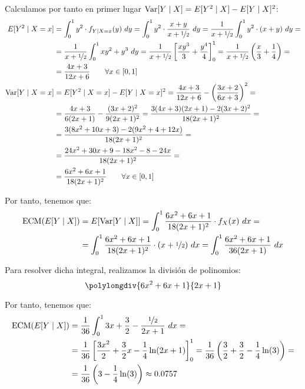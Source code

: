 \begin{ejercicio}
\begin{enumerate}
        Calculamos por tanto en primer lugar $\operatorname{Var}[Y\mid X] = E[Y^2\mid X] - E[Y\mid X]^2$:
        \begin{align*}
            E[Y^2\mid X = x] &= \int_{0}^{1} y^2\cdot f_{Y\mid X=x}(y) \ dy
            = \int_{0}^{1} y^2\cdot \dfrac{x+y}{x+\nicefrac{1}{2}} \ dy
            = \dfrac{1}{x+\nicefrac{1}{2}}\int_{0}^{1} y^2\cdot (x+y) \ dy
            =\\&= \dfrac{1}{x+\nicefrac{1}{2}}\int_{0}^{1} xy^2+y^3 \ dy
            = \dfrac{1}{x+\nicefrac{1}{2}}\left[\frac{xy^3}{3}+\frac{y^4}{4}\right]_{0}^{1}
            = \dfrac{1}{x+\nicefrac{1}{2}}\left(\frac{x}{3}+\frac{1}{4}\right)
            =\\&= \dfrac{4x+3}{12x+6} \qquad \forall x\in[0,1]\\
            \Var[Y\mid X = x] &= E[Y^2\mid X = x] - E[Y\mid X = x]^2
            = \dfrac{4x+3}{12x+6} - \left(\dfrac{3x+2}{6x+3}\right)^2
            =\\&= \dfrac{4x+3}{6(2x+1)} - \dfrac{(3x+2)^2}{9(2x+1)^2}
            = \dfrac{3(4x+3)(2x+1)-2(3x+2)^2}{18(2x+1)^2}
            =\\&= \dfrac{3(8x^2+10x+3)-2(9x^2+4+12x)}{18(2x+1)^2}
            =\\&= \dfrac{24x^2+30x+9-18x^2-8-24x}{18(2x+1)^2}
            =\\&= \dfrac{6x^2+6x+1}{18(2x+1)^2} \qquad \forall x\in[0,1]
        \end{align*}

        Por tanto, tenemos que:
        \begin{align*}
            \text{ECM}(E[Y\mid X]) &= E[\Var[Y\mid X]]
            = \int_{0}^{1} \dfrac{6x^2+6x+1}{18(2x+1)^2} \cdot f_X(x) \ dx
            =\\&= \int_{0}^{1} \dfrac{6x^2+6x+1}{18(2x+1)^2} \cdot (x+\nicefrac{1}{2}) \ dx
            = \int_{0}^{1} \dfrac{6x^2+6x+1}{36(2x+1)} \ dx
        \end{align*}

        Para resolver dicha integral, realizamos la división de polinomios:
        $$\polylongdiv{6x^2+6x+1}{2x+1}$$

        Por tanto, tenemos que:
        \begin{align*}
            \text{ECM}(E[Y\mid X]) &= \dfrac{1}{36}\int_{0}^{1} 3x+\dfrac{3}{2}-\dfrac{\nicefrac{1}{2}}{2x+1} \ dx
            =\\&= \dfrac{1}{36}\left[\dfrac{3x^2}{2}+\dfrac{3}{2}x-\dfrac{1}{4}\ln(2x+1)\right]_{0}^{1}
            = \dfrac{1}{36}\left(\dfrac{3}{2}+\dfrac{3}{2}-\dfrac{1}{4}\ln(3)\right)
            =\\&= \dfrac{1}{36}\left(3 - \dfrac{1}{4}\ln(3)\right)\approx 0.0757
        \end{align*}


\end{enumerate}
\end{ejercicio}
